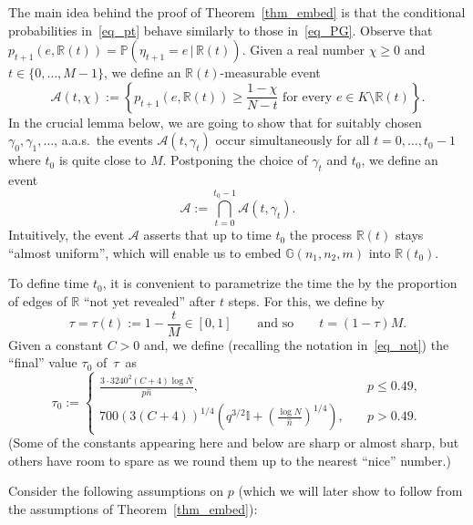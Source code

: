 \documentclass[12pt,reqno]{amsart}
\newcommand{\ac}{{\mathcal{A}}}
\newcommand{\Prob} {\mathbb {P}}
\newcommand{\prob}[1]{\Prob\left(#1\right)}
\newcommand{\Pc}[2]{\prob{#1\,|\,#2}}
\newcommand{\R} {\mathbb R}
\newcommand{\G} {\mathbb G}
\newcommand{\Gnnm} {\G(n_1,n_2,m)}
\newcommand{\I} {\mathbb I}
\theoremstyle{definition}
\begin{document}
The main idea behind the proof of Theorem~\ref{thm_embed} is that the conditional probabilities in~\eqref{eq_pt} behave similarly to those in~\eqref{eq_PG}. Observe that $p_{t+1}(e,\R(t)) = \Pc{\eta_{t+1} = e}{\R(t)}$.
Given a real number $\chi \ge 0$ and $t \in \{0, \dots, M - 1\}$, we define an $\R(t)$-measurable event
\begin{equation*}
	\ac(t,\chi) := \left\{ p_{t+1}(e,\R(t)) \ge \frac{1 - \chi}{N - t} \text{ for every } e \in K \setminus \R(t) \right\}.
\end{equation*}
In the crucial lemma below, we are going to show that for suitably chosen $\gamma_0, \gamma_1, \dots$, a.a.s.\ the events $\ac(t,\gamma_t)$ occur simultaneously for all $t = 0,\dots,t_0-1$ where $t_0$ is quite close to $M$. Postponing the choice of $\gamma_t$ and $t_0$, we define an event
\begin{equation}
  \label{eq_ac}
	\ac := \bigcap_{t = 0}^{ t_0 - 1}\ac(t, \gamma_t).
\end{equation}
  Intuitively, the event $\ac$ asserts that up to time $t_0$ the process $\R(t)$ stays ``almost uniform'', which will enable us to embed $\Gnnm$ into $\R(t_0)$.



  To define time $t_0$, it is convenient to parametrize the time the by the proportion of edges of $\R$ ``not yet revealed'' after $t$ steps. For this, we define by
\begin{equation}
  \label{eq_tau}
  \tau = \tau(t) := 1 - \frac{t}{M} \in [0,1]\qquad\text{and so}\qquad t = (1 - \tau)M.
\end{equation}
Given a constant $C > 0$ and, we define (recalling the notation in~\eqref{eq_not}) the ``final'' value $\tau_0$ of~$\tau$~as
\begin{equation}
  \label{eq_tauzero}
	\tau_0 := \begin{cases}
		 \frac{3 \cdot 3240^2(C + 4)\log N}{p \hat n}, \quad & p \le 0.49, \\
		 700(3(C + 4))^{1/4} \left( q^{3/2}\I + \left(\frac{\log N}{\hat n}\right)^{1/4}\right),
		\quad & p > 0.49.
	\end{cases}
\end{equation}
(Some of the constants appearing here and below are sharp or almost sharp, but others have room to spare as we round them up to the nearest ``nice'' number.)


Consider the following assumptions on $p$ (which we will later show to follow from the assumptions of Theorem~\ref{thm_embed}):
\end{document}
